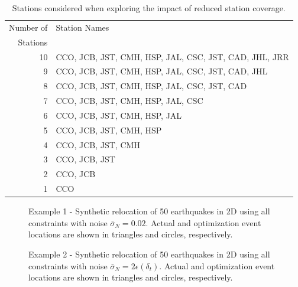 \documentclass[12pt,double]{article}
\begin{document}
\begin{table}
\caption{Stations considered when exploring the impact of reduced
station coverage.} \label{tab:Calaveras-stationremoval}
\begin{tabular}{|r|l|}
\hline
Number of & Station Names\\
Stations  & \\
\hline
10 & CCO, JCB, JST, CMH, HSP, JAL, CSC, JST, CAD, JHL, JRR\\
9  & CCO, JCB, JST, CMH, HSP, JAL, CSC, JST, CAD, JHL\\
8  & CCO, JCB, JST, CMH, HSP, JAL, CSC, JST, CAD\\
7  & CCO, JCB, JST, CMH, HSP, JAL, CSC \\
6  & CCO, JCB, JST, CMH, HSP, JAL \\
5  & CCO, JCB, JST, CMH, HSP \\
4  & CCO, JCB, JST, CMH \\
3  & CCO, JCB, JST \\
2  & CCO, JCB \\
1  & CCO \\
\hline
\end{tabular}
\end{table}



\clearpage


\begin{figure}
\caption{Example 1 - Synthetic relocation of 50 earthquakes in 2D
using all constraints with noise $\bar{\sigma}_N=0.02$. Actual and
optimization event locations are shown in triangles and circles,
respectively.} \label{fig-2D50eq-relocation_eg1}
\end{figure}


\begin{figure}
\caption{Example 2 - Synthetic relocation of 50 earthquakes in 2D
using all constraints with noise $\bar{\sigma}_N= 2
\epsilon(\delta_t)$.
 Actual and optimization event locations
are shown in triangles and circles, respectively.}
\label{fig-2D50eq-relocation_eg3}
\end{figure}
\end{document}
